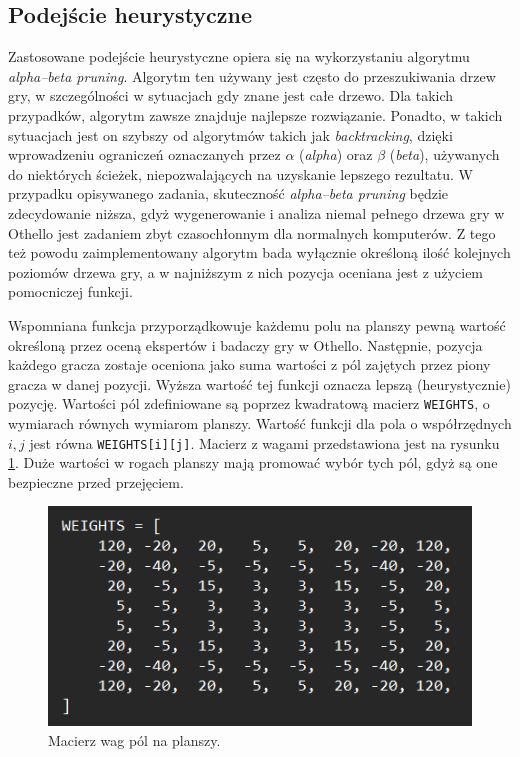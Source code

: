 \documentclass[10pt]{article}
\begin{document}
\subsection{Podejście heurystyczne}
\label{sec:heuristic}
Zastosowane podejście heurystyczne opiera się na wykorzystaniu algorytmu \textit{alpha–beta pruning}. Algorytm ten używany jest często do przeszukiwania drzew gry, w szczególności w sytuacjach gdy znane jest całe drzewo. Dla takich przypadków, algorytm zawsze znajduje najlepsze rozwiązanie. Ponadto, w takich sytuacjach jest on szybszy od algorytmów takich jak \textit{backtracking}, dzięki wprowadzeniu ograniczeń oznaczanych przez $\alpha$ (\textit{alpha}) oraz $\beta$ (\textit{beta}), używanych do  niektórych ścieżek, niepozwalających na uzyskanie lepszego rezultatu. W przypadku opisywanego zadania, skuteczność \textit{alpha–beta pruning} będzie zdecydowanie niższa, gdyż wygenerowanie i analiza niemal pełnego drzewa gry w Othello jest zadaniem zbyt czasochłonnym dla normalnych komputerów. Z tego też powodu zaimplementowany algorytm bada wyłącznie określoną ilość kolejnych poziomów drzewa gry, a w najniższym z nich pozycja oceniana jest z użyciem pomocniczej funkcji.

Wspomniana funkcja przyporządkowuje każdemu polu na planszy pewną wartość określoną przez oceną ekspertów i badaczy gry w Othello. Następnie, pozycja każdego gracza zostaje oceniona jako suma wartości z pól zajętych przez piony gracza w danej pozycji. Wyższa wartość tej funkcji oznacza lepszą (heurystycznie) pozycję. Wartości pól zdefiniowane są poprzez kwadratową macierz \texttt{WEIGHTS}, o wymiarach równych wymiarom planszy. Wartość funkcji dla pola o współrzędnych $i,j$ jest równa \texttt{WEIGHTS[i][j]}. Macierz z wagami przedstawiona jest na rysunku \ref{fig:weights}. Duże wartości w rogach planszy mają promować wybór tych pól, gdyż są one bezpieczne przed przejęciem.

\begin{figure}[H]
\centering
\includegraphics[width =0.5\columnwidth]{images/matrix.png}
\caption{Macierz wag pól na planszy.}
\label{fig:weights}
\end{figure}
\end{document}
